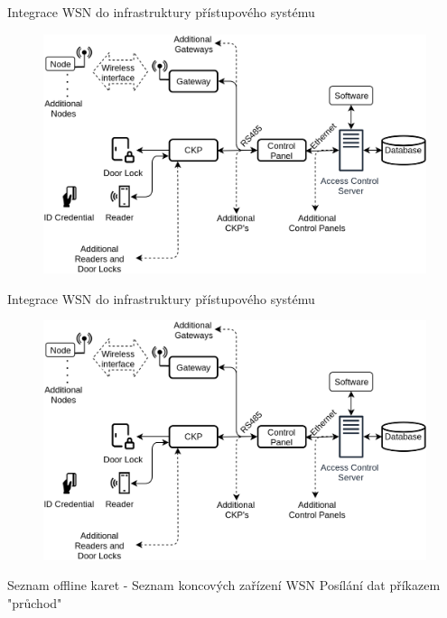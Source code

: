 \documentclass{beamer}
\begin{document}
\begin{frame}{Integrace WSN do infrastruktury přístupového systému}

	\begin{figure}[h]
		\centering
		\includegraphics[width=1\textwidth]{ACS_IoT_extension_21}
		\label{fig:ACS architecture IMA with geteway}
	\end{figure}
		
\end{frame}




\begin{frame}{Integrace WSN do infrastruktury přístupového systému}

	\begin{figure}[h]
		\centering
		\includegraphics[width=1\textwidth]{ACS_IoT_extension_21}
		\label{fig:ACS architecture IMA with geteway}
	\end{figure}

	\vspace{-25pt}
	Seznam offline karet -  Seznam koncových zařízení WSN
	Posílání dat příkazem "průchod"
	
\end{frame}
\end{document}
